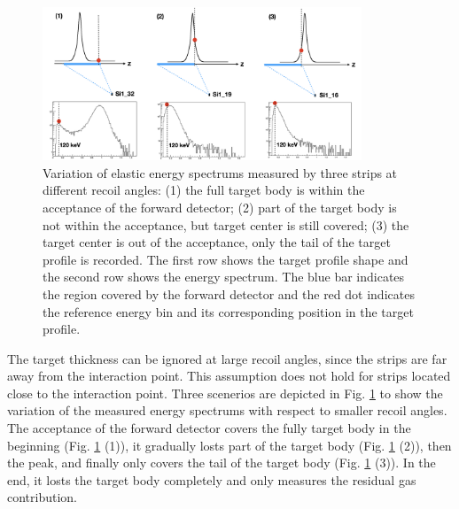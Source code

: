 \documentclass[fleqn,twocolumn,a4paper]{ikpar}
\begin{document}
\begin{figure}[b]
  \centering
	\includegraphics[width=0.85\textwidth]{./target_density_determination.png}
  \caption{Variation of elastic energy spectrums measured by three strips at different recoil angles: (1) the full target body is within the acceptance of the
  forward detector; (2) part of the target body is not within the
  acceptance, but target center is still covered; (3) the target center is out of the
  acceptance, only the tail of the target profile is recorded. The first row
  shows the target profile shape and the second row shows the energy
  spectrum. The blue bar indicates the region covered by
  the forward detector and the red dot indicates the reference energy bin and
  its corresponding position in the target profile.}
  \label{fig:target_density_determination}
\end{figure}

\par
\medskip

The target thickness can be ignored at large recoil angles, since the strips are
far away from the interaction point.
This assumption does not hold for strips located close to the interaction point.
Three scenerios are depicted in Fig. \ref{fig:target_density_determination} to
show the variation of the measured energy spectrums with respect to smaller
recoil angles.
The acceptance of the forward detector covers the fully target body in the
beginning (Fig. \ref{fig:target_density_determination} (1)), it gradually losts part of the target body
(Fig. \ref{fig:target_density_determination} (2)), then the peak, and finally only covers
the tail of the target body (Fig. \ref{fig:target_density_determination} (3)).
In the end, it losts the target body completely and only measures the residual
gas contribution.

\par
\medskip
\end{document}
